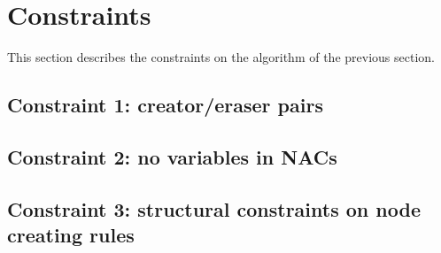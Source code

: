 \section{Constraints}

This section describes the constraints on the algorithm of the previous section.

\subsection{Constraint 1: creator/eraser pairs}

\subsection{Constraint 2: no variables in NACs}

\subsection{Constraint 3: structural constraints on node creating rules}
